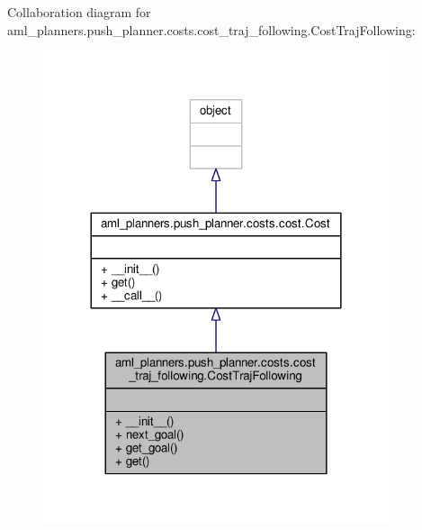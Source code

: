 Collaboration diagram for aml\-\_\-planners.\-push\-\_\-planner.\-costs.\-cost\-\_\-traj\-\_\-following.\-Cost\-Traj\-Following\-:\nopagebreak
\begin{figure}[H]
\begin{center}
\leavevmode
\includegraphics[width=288pt]{classaml__planners_1_1push__planner_1_1costs_1_1cost__traj__following_1_1_cost_traj_following__coll__graph}
\end{center}
\end{figure}
